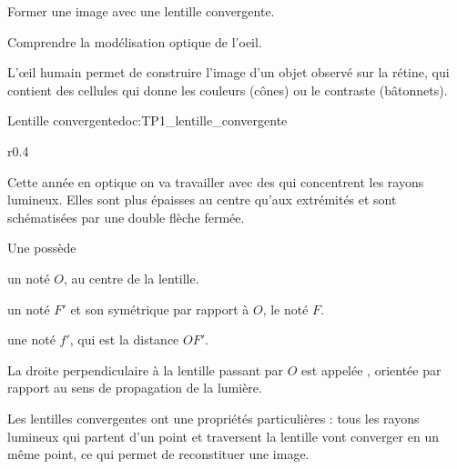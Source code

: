 \teteSndLumi
\vspace*{-30pt}



\vspace*{-12pt}
\begin{objectifs}
  \item Former une image avec une lentille convergente.
  \item Comprendre la modélisation optique de l'oeil.
\end{objectifs}

\begin{contexte}
  L’œil humain permet de construire l'image d'un objet observé sur la rétine, qui contient des cellules qui donne les couleurs (cônes) ou le contraste (bâtonnets).
  
\end{contexte}


\begin{doc}{Lentille convergente}{doc:TP1_lentille_convergente}
  \begin{wrapfigure}[4]{r}{0.4\linewidth}
    \centering
    \vspace*{-42pt}
  \end{wrapfigure}
  
  Cette année en optique on va travailler avec des  qui concentrent les rayons lumineux.
  Elles sont plus épaisses au centre qu'aux extrémités et sont schématisées par une double flèche fermée.

  \begin{importants}
    Une  possède
    \begin{listePoints}
      \item un  noté $O$, au centre de la lentille. 
      \item un  noté $F'$ et son symétrique par rapport à $O$, le  noté $F$.
      \item une  noté $f'$, qui est la distance $OF'$.
    \end{listePoints}
    
    La droite perpendiculaire à la lentille passant par $O$ est appelée , orientée par rapport au sens de propagation de la lumière.
  \end{importants}

  Les lentilles convergentes ont une propriétés particulières : tous les rayons lumineux qui partent d'un point et traversent la lentille vont converger en un même point, ce qui permet de reconstituer une image.
\end{doc}

